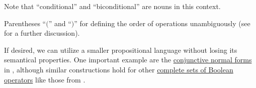 \begin{definition}
\begin{thmenum}
     Note that \enquote{conditional} and \enquote{biconditional} are nouns in this context.

     Parentheses \enquote{\( ( \)} and \enquote{\( ) \)} for defining the order of operations unambiguously (see  for a further discussion).
  \end{thmenum}
\end{definition}
\begin{comments}
  \item If desired, we can utilize a smaller propositional language without losing its semantical properties. One important example are the \hyperref[def:cnf_and_dnf]{conjunctive normal forms} in , although similar constructions hold for other \hyperref[def:boolean_closure/complete]{complete sets of Boolean operators} like those from .
\end{comments}

